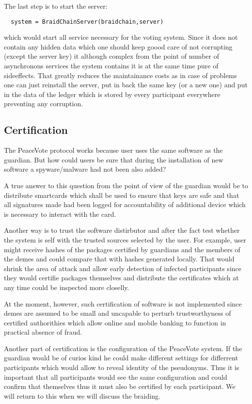 \documentclass{article}
\begin{document}
The last step is to start the server:
\begin{lstlisting}
  system = BraidChainServer(braidchain,server)
\end{lstlisting}
which would start all service necessary for the voting system. Since it does not contain any hidden data which one should keep goood care of not corrupting (except the server key) it although complex from the point of number of asynchronous services the system contains it is at the same time pure of sideeffects. That greatly reduces the maintainance costs as in case of problems one can just reinstall the server, put in back the same key (or a new one) and put in the data of the ledger which is stored by every participant everywhere preventing any corruption. 

\subsection{Certification}

The PeaceVote protocol works because user uses the same software as the guardian. But how could users be sure that during the installation of new software a spyware/malware had not been also added?

A true answer to this question from the point of view of the guardian would be to distribute smartcards which shall be used to ensure that keys are safe and that all signatures made had been logged for accountability of additional device which is necessary to interact with the card.

Another way is to trust the software distirbutor and after the fact test whether the system is self with the trusted sources selected by the user. For example, user might receive hashes of the packages certified by guardians and the members of the demes and could compare that with hashes generated locally. That would shrink the area of attack and allow early detection of infected participants since they would certifie packages themselves and distribute the certificates which at any time could be inspected more closelly.

At the moment, however, such certification of software is not implemented since demes are assumed to be small and uncapable to perturb trustworthyness of certified authorithies which allow online and mobile banking to function in practical absence of fraud.

Another part of certification is the configuration of the PeaceVote system. If the guardian would be of curios kind he could make different settings for differrent participants which would allow to reveal identity of the pseudonyms. Thus it is important that all participants would see the same configuration and could confirm that themselves thus it must also be certified by each participant. We will return to this when we will discuss the braiding.
\end{document}
